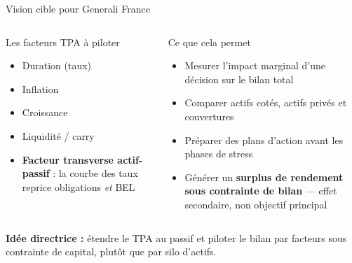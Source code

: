 \documentclass[aspectratio=169,11pt]{beamer}
\newcommand{\highlight}[1]{\textcolor{GeneraliRed}{\textbf{#1}}}
\begin{document}
\begin{frame}[shrink=15]{Vision cible pour Generali France}
  \begin{columns}[T,totalwidth=\textwidth]
    \begin{block}{Les facteurs TPA à piloter}
      \begin{itemize}
        \item Duration (taux)
        \item Inflation
        \item Croissance
        \item Liquidité / carry
        \item \highlight{Facteur transverse actif-passif} : la courbe des taux reprice obligations \emph{et} BEL
      \end{itemize}
    \end{block}

    \begin{block}{Ce que cela permet}
      \begin{itemize}
        \item Mesurer l'impact marginal d'une décision sur le bilan total
        \item Comparer actifs cotés, actifs privés et couvertures
        \item Préparer des plans d'action avant les phases de stress
        \item Générer un \highlight{surplus de rendement sous contrainte de bilan} — effet secondaire, non objectif principal
      \end{itemize}
    \end{block}
  \end{columns}

  \vspace{0.1cm}
  \centering
  {\footnotesize \highlight{Idée directrice :} étendre le TPA au passif et piloter le bilan par facteurs sous contrainte de capital, plutôt que par silo d'actifs.}
\end{frame}
\end{document}
